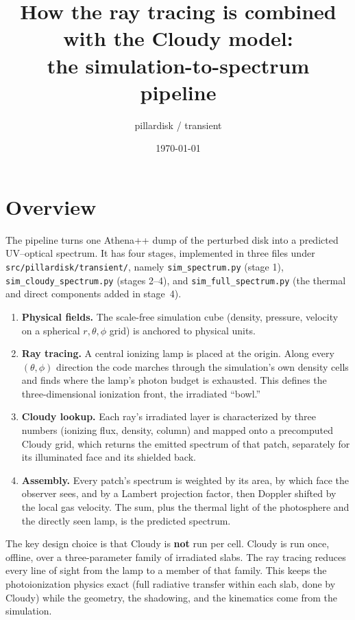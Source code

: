 \documentclass[11pt]{article}
\title{How the ray tracing is combined with the Cloudy model:\\
the simulation-to-spectrum pipeline}
\author{pillardisk / transient}
\date{\today}
\begin{document}
\maketitle

\section{Overview}

The pipeline turns one Athena++ dump of the perturbed disk into a
predicted UV--optical spectrum. It has four stages, implemented in
three files under \texttt{src/pillardisk/transient/}, namely
\texttt{sim\_spectrum.py} (stage 1),
\texttt{sim\_cloudy\_spectrum.py} (stages 2--4), and
\texttt{sim\_full\_spectrum.py} (the thermal and direct
components added in stage~4).

\begin{enumerate}
\item \textbf{Physical fields.} The scale-free simulation cube
      (density, pressure, velocity on a spherical $r,\theta,\phi$ grid)
      is anchored to physical units.
\item \textbf{Ray tracing.} A central ionizing lamp is placed at the
      origin. Along every $(\theta,\phi)$ direction the code marches
      through the simulation's own density cells and finds where the
      lamp's photon budget is exhausted. This defines the
      three-dimensional ionization front, the irradiated ``bowl.''
\item \textbf{Cloudy lookup.} Each ray's irradiated layer is
      characterized by three numbers (ionizing flux, density, column)
      and mapped onto a precomputed Cloudy grid, which returns the
      emitted spectrum of that patch, separately for its illuminated
      face and its shielded back.
\item \textbf{Assembly.} Every patch's spectrum is weighted by its
      area, by which face the observer sees, and by a Lambert
      projection factor, then Doppler shifted by the local gas
      velocity. The sum, plus the thermal light of the photosphere and
      the directly seen lamp, is the predicted spectrum.
\end{enumerate}

The key design choice is that Cloudy is \textbf{not} run per cell.
Cloudy is run once, offline, over a three-parameter family of
irradiated slabs. The ray tracing reduces every line of sight from the
lamp to a member of that family. This keeps the photoionization
physics exact (full radiative transfer within each slab, done by
Cloudy) while the geometry, the shadowing, and the kinematics come
from the simulation.
\end{document}
